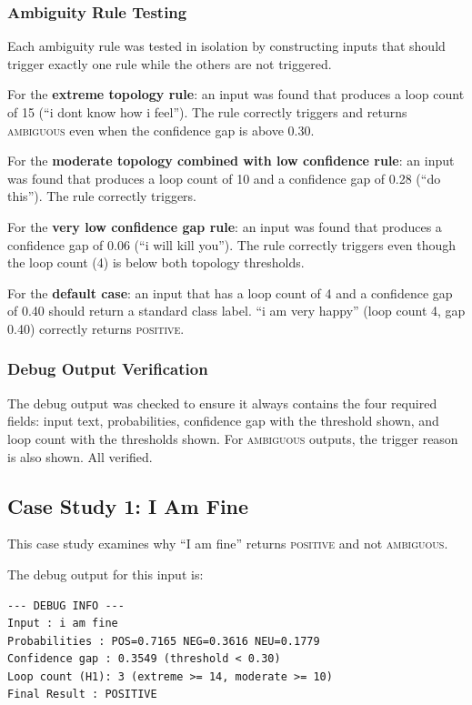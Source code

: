 \subsubsection*{Ambiguity Rule Testing}

Each ambiguity rule was tested in isolation by constructing inputs that should trigger exactly
one rule while the others are not triggered.

For the \textbf{extreme topology rule}: an input was found that produces a loop count of 15
(``i dont know how i feel''). The rule correctly triggers and returns \textsc{ambiguous} even
when the confidence gap is above 0.30.

For the \textbf{moderate topology combined with low confidence rule}: an input was found that
produces a loop count of 10 and a confidence gap of 0.28 (``do this''). The rule correctly
triggers.

For the \textbf{very low confidence gap rule}: an input was found that produces a confidence
gap of 0.06 (``i will kill you''). The rule correctly triggers even though the loop count (4) is
below both topology thresholds.

For the \textbf{default case}: an input that has a loop count of 4 and a confidence gap of 0.40
should return a standard class label. ``i am very happy'' (loop count 4, gap 0.40) correctly
returns \textsc{positive}.

\subsubsection*{Debug Output Verification}

The debug output was checked to ensure it always contains the four required fields: input text,
probabilities, confidence gap with the threshold shown, and loop count with the thresholds
shown. For \textsc{ambiguous} outputs, the trigger reason is also shown. All verified.

\subsection{Case Study 1: I Am Fine}

This case study examines why ``I am fine'' returns \textsc{positive} and not \textsc{ambiguous}.

The debug output for this input is:

\begin{verbatim}
--- DEBUG INFO ---
Input : i am fine
Probabilities : POS=0.7165 NEG=0.3616 NEU=0.1779
Confidence gap : 0.3549 (threshold < 0.30)
Loop count (H1): 3 (extreme >= 14, moderate >= 10)
Final Result : POSITIVE
\end{verbatim}

